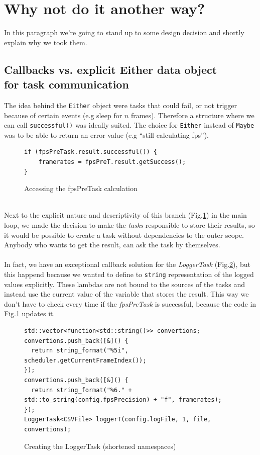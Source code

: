 \documentclass[titlepage]{article}
\begin{document}
\newpage
\section{Why not do it another way?}

In this paragraph we're going to stand up to some design decision and shortly explain why we took them.

\subsection{Callbacks vs. explicit Either data object\\ for task communication}

The idea behind the \texttt{Either} object were tasks that could fail, or not trigger because of certain events (e.g sleep for $n$ frames). Therefore a structure where we can call \texttt{successful()} was ideally suited. The choice for \texttt{Either} instead of \texttt{Maybe} was to be able to return an error value (e.g ``still calculating fps'').

\begin{figure}[H]
\begin{verbatim}
if (fpsPreTask.result.successful()) {
    framerates = fpsPreT.result.getSuccess();
}
\end{verbatim}
\caption{Accessing the fpsPreTask calculation}
\label{code:fpspretask-glue}
\end{figure}
\hfill\\
Next to the explicit nature and descriptivity of this branch (Fig.\ref{code:fpspretask-glue}) in the main loop, we made the decision to make the \textit{tasks} responsible to store their results, so it would be possible to create a task without dependencies to the outer scope. Anybody who wants to get the result, can ask the task by themselves.\\
\hfill \\
In fact, we have an exceptional callback solution for the \textit{LoggerTask} (Fig.\ref{code:logger-init}), but this happend because we wanted to define to \texttt{string} representation of the logged values explicitly. These lambdas are not bound to the sources of the tasks and instead use the current value of the variable that stores the result. This way we don't have to check every time if the \textit{fpsPreTask} is successful, because the code in Fig.\ref{code:fpspretask-glue} updates it.

\begin{figure}[H]
\begin{verbatim}
std::vector<function<std::string()>> convertions;
convertions.push_back([&]() {
  return string_format("%5i", scheduler.getCurrentFrameIndex());
});
convertions.push_back([&]() {
  return string_format("%6." + std::to_string(config.fpsPrecision) + "f", framerates);
});
LoggerTask<CSVFile> loggerT(config.logFile, 1, file, convertions);
\end{verbatim}
\caption{Creating the LoggerTask (shortened namespaces)}
\label{code:logger-init}
\end{figure}
\end{document}
